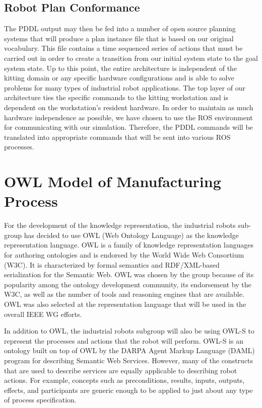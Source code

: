 \documentclass[a4paper, 10pt, conference]{ieeeconf}      %
\begin{document}
\subsection{Robot Plan Conformance}
The PDDL output may then be fed into a number of open source planning systems that will produce a plan instance file that is based on our original vocabulary. This file
contains a time sequenced series of actions that must be carried out in order to create a transition from our initial system state to the goal system state. Up to this point,
the entire architecture is independent of the kitting domain or any specific hardware configurations and is able to solve problems for many types of industrial robot applications. 
The top layer of our architecture ties the specific commands to the kitting workstation and is dependent on the workstation's resident hardware.  In order to maintain as
much hardware independence as possible, we have chosen to use the ROS environment for communicating with our simulation. Therefore, the PDDL commands will
be translated into appropriate commands that will be sent into various ROS processes.

\section{OWL Model of Manufacturing Process}
\label{sect:OWL_Layer}
For the development of the  knowledge representation, the industrial robots sub-group has decided to use OWL (Web Ontology Language) \cite{OWL} as the knowledge representation language. OWL is a family of knowledge representation languages for authoring ontologies and is endorsed by the World Wide Web Consortium (W3C). It is characterized by formal semantics and RDF/XML-based serialization for the Semantic Web. OWL was chosen by the group because of its popularity among the ontology development community, its endorsement by the W3C, as well as the number of tools and reasoning engines that are available. OWL was also selected at the representation language that will be used in the overall IEEE WG efforts.

In addition to OWL, the industrial robots subgroup will also be using OWL-S \cite{Martin2012} to represent the processes and actions that the robot will perform. OWL-S is an ontology built on top of OWL by the DARPA Agent Markup Language (DAML) program \cite{damlWeb}
for describing Semantic Web Services. However, many of the constructs that are used to describe services are equally applicable to describing robot actions. For example, concepts such as preconditions, results, inputs, outputs, effects, and participants are generic enough to be applied to just about any type of process specification. 
\end{document}
